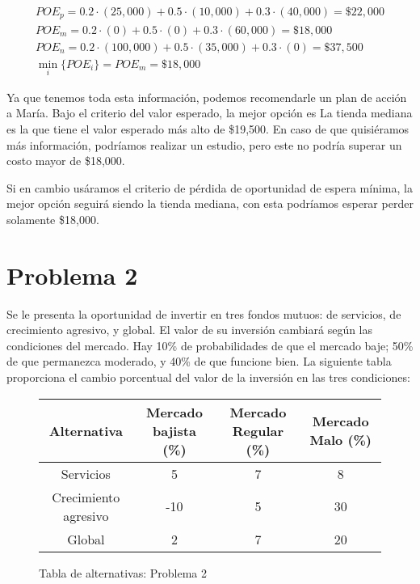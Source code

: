 \documentclass{article}
\begin{document}
            \begin{gather*}
                POE_p = 0.2 \cdot (25,000) + 0.5 \cdot (10,000) + 0.3 \cdot (40,000) = \$ 22,000 \\
                POE_m = 0.2 \cdot (0) + 0.5 \cdot (0) + 0.3 \cdot (60,000) = \$18,000 \\
                POE_n = 0.2 \cdot (100,000) + 0.5 \cdot (35,000) + 0.3 \cdot (0) = \$37,500 \\
                \min_i \{POE_i\} = POE_m = \$18,000
            \end{gather*}

        Ya que tenemos toda esta información, podemos recomendarle un plan de acción a María. Bajo el criterio del valor esperado, la mejor opción es La tienda mediana es la que tiene el valor esperado más alto de \$19,500. En caso de que quisiéramos más información, podríamos realizar un estudio, pero este no podría superar un costo mayor de \$18,000.

        Si en cambio usáramos el criterio de pérdida de oportunidad de espera mínima, la mejor opción seguirá siendo la tienda mediana, con esta podríamos esperar perder solamente \$18,000.

    \section{Problema 2}

        Se le presenta la oportunidad de invertir en tres fondos mutuos: de servicios, de crecimiento agresivo, y global. El valor de su inversión cambiará según las condiciones del mercado. Hay 10\% de probabilidades de que el mercado baje; 50\% de que permanezca moderado, y 40\% de que funcione bien. La siguiente tabla proporciona el cambio porcentual del valor de la inversión en las tres condiciones:

        \begin{figure}[!htbp]
            \centering
            \begin{tabular}{ |cccc| }
                \hline
                Alternativa & Mercado bajista (\%) & Mercado Regular (\%) & Mercado Malo (\%) \\
                \hline
                Servicios & 5 & 7 & 8 \\
                \hline
                Crecimiento agresivo & -10 & 5 & 30 \\
                \hline
                Global & 2 & 7 & 20 \\
                \hline
            \end{tabular}
            \caption{Tabla de alternativas: Problema 2}
            \label{tabla:problema2}
        \end{figure}
\end{document}
